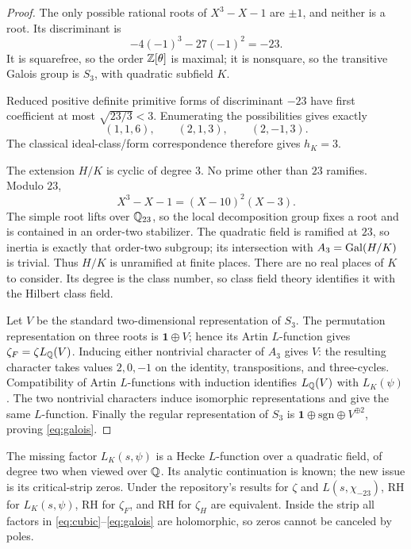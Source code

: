 \begin{proof}
The only possible rational roots of \(X^3-X-1\) are \(\pm1\), and neither is a root. Its discriminant is
\[
-4(-1)^3-27(-1)^2=-23.
\]
It is squarefree, so the order \(\mathbb{Z}[\theta]\) is maximal; it is nonsquare, so the transitive Galois group is \(S_3\), with quadratic subfield \(K\).

Reduced positive definite primitive forms of discriminant \(-23\) have first coefficient at most \(\sqrt{23/3}<3\). Enumerating the possibilities gives exactly
\[
(1,1,6),\qquad (2,1,3),\qquad (2,-1,3).
\]
The classical ideal-class/form correspondence therefore gives \(h_K=3\).

The extension \(H/K\) is cyclic of degree \(3\). No prime other than \(23\) ramifies. Modulo \(23\),
\[
X^3-X-1=(X-10)^2(X-3).
\]
The simple root lifts over \(\mathbb{Q}_{23}\), so the local decomposition group fixes a root and is contained in an order-two stabilizer. The quadratic field is ramified at \(23\), so inertia is exactly that order-two subgroup; its intersection with \(A_3=\operatorname{Gal}(H/K)\) is trivial. Thus \(H/K\) is unramified at finite places. There are no real places of \(K\) to consider. Its degree is the class number, so class field theory identifies it with the Hilbert class field.

Let \(V\) be the standard two-dimensional representation of \(S_3\). The permutation representation on three roots is \(\mathbf1\oplus V\); hence its Artin \(L\)-function gives \(\zeta_F=\zeta L_{\mathbb{Q}}(V)\). Inducing either nontrivial character of \(A_3\) gives \(V\): the resulting character takes values \(2,0,-1\) on the identity, transpositions, and three-cycles. Compatibility of Artin \(L\)-functions with induction identifies \(L_{\mathbb{Q}}(V)\) with \(L_K(\psi)\). The two nontrivial characters induce isomorphic representations and give the same \(L\)-function. Finally the regular representation of \(S_3\) is \(\mathbf1\oplus\mathrm{sgn}\oplus V^{\oplus2}\), proving \eqref{eq:galois}.
\end{proof}

The missing factor \(L_K(s,\psi)\) is a Hecke \(L\)-function over a quadratic field, of degree two when viewed over \(\mathbb{Q}\). Its analytic continuation is known; the new issue is its critical-strip zeros. Under the repository's results for \(\zeta\) and \(L(s,\chi_{-23})\), RH for \(L_K(s,\psi)\), RH for \(\zeta_F\), and RH for \(\zeta_H\) are equivalent. Inside the strip all factors in \eqref{eq:cubic}--\eqref{eq:galois} are holomorphic, so zeros cannot be canceled by poles.

